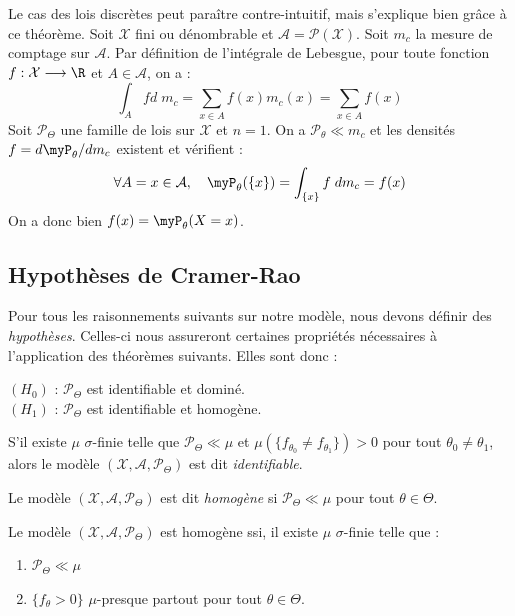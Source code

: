 \begin{remark}
    Le cas des lois discrètes peut paraître contre-intuitif, mais s'explique bien 
    grâce à ce théorème. Soit $ \mathcal{X}$ fini ou dénombrable et $ \mathcal{A} = \mathcal{P}( \mathcal{X})$. 
    Soit $ m_c$ la mesure de comptage sur $ \mathcal{A}$. Par définition de l'intégrale de Lebesgue, pour toute 
    fonction $ f : \mathcal{X} \longrightarrow \R$ et $ A \in \mathcal{A}$, on a : 
        $$ \int_A f d \; m_c = \sum_{x \in A} f(x) m_c(x) = \sum_{x \in A} f(x) $$ 
    Soit $ \mathcal{P}_\Theta$ une famille de lois sur $ \mathcal{X}$ et $n = 1$. On a $ \mathcal{P}_\theta \ll m_c$ et 
    les densités $f = d \myP_\theta / d m_c$ existent et vérifient :
        $$ \forall A = {x} \in \mathcal{A}, \quad \myP_\theta(\{x\}) = \int_{\{x\}} f \; d m_c = f(x) $$
    On a donc bien $f(x) = \myP_\theta(X = x)$. 
\end{remark}

\subsection{Hypothèses de Cramer-Rao}

Pour tous les raisonnements suivants sur notre modèle, nous devons définir des \emph{hypothèses}. 
Celles-ci nous assureront certaines propriétés nécessaires à l'application des théorèmes suivants. 
Elles sont donc : 
    \begin{center}
        $(H_0)$ : $ \mathcal{P}_\Theta$ est identifiable et dominé. \\
        $(H_1)$ : $ \mathcal{P}_\Theta$ est identifiable et homogène. 
    \end{center}

\begin{proposition}
    S'il existe $ \mu$ $ \sigma$-finie telle que $ \mathcal{P}_\Theta \ll \mu$ et $ \mu(\{f_{\theta_0} \not = f_{\theta_1}\}) > 0$ 
    pour tout $ \theta_0 \not = \theta_1$, alors le modèle $( \mathcal{X}, \mathcal{A}, \mathcal{P}_\Theta)$ 
    est dit \emph{identifiable}. 
\end{proposition}

\begin{definition}
    Le modèle $( \mathcal{X}, \mathcal{A}, \mathcal{P}_\Theta)$ est dit \emph{homogène} si 
    $ \mathcal{P}_\Theta \ll \mu$ pour tout $ \theta \in \Theta$. 
\end{definition}

\begin{proposition}
    Le modèle $( \mathcal{X}, \mathcal{A}, \mathcal{P}_\Theta)$ est homogène ssi, il existe $ \mu$ 
    $ \sigma$-finie telle que : 
    \begin{enumerate}[label=\roman*)]
        \item $ \mathcal{P}_\Theta \ll \mu$ 
        \item $\{f_\theta > 0\}$ $ \mu$-presque partout pour tout $ \theta \in \Theta$. 
    \end{enumerate}
\end{proposition}

